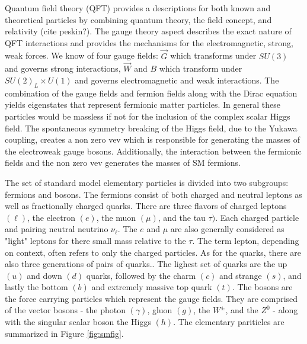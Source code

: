 Quantum field theory (QFT) provides a descriptions for both known and theoretical particles by combining quantum theory, the field concept, and relativity (cite peskin?). The gauge theory aspect describes the exact nature of QFT interactions and provides the mechanisms for the electromagnetic, strong, weak forces.  We know of four gauge fields:  $\vec{G}$ which transforms under $SU(3)$ and governs strong interactions, $\vec{W}$ and $B$ which transform under $SU(2)_L \times U(1)$ and governs electromagnetic and weak interactions. The combination of the gauge fields and fermion fields along with the Dirac equation yields eigenstates that represent fermionic matter particles. In general these particles would be massless if not for the inclusion of the complex scalar Higgs field.  The spontaneous symmetry breaking of the Higgs field, due to the Yukawa coupling, creates a non zero vev which is responsible for generating the masses of the electroweak gauge bosons. Additionally, the interaction between the fermionic fields and the non zero vev generates the masses of SM fermions.

The set of standard model elementary particles is divided into two subgroups: fermions and bosons.  The fermions consist of both charged and neutral leptons as well as fractionally charged quarks. There are three flavors of charged leptons $(\ell)$, the electron $(e)$, the muon $(\mu)$, and the tau $\tau)$. Each charged particle and pairing neutral neutrino $\nu_\ell$. The $e$ and $\mu$ are also generally considered as "light" leptons for there small mass relative to the $\tau$. The term lepton, depending on context, often refers to only the charged particles. As for the quarks, there are also three generations of pairs of quarks.. The lighest set of quarks are the up $(u)$ and down $(d)$ quarks, followed by the charm $(c)$ and strange $(s)$, and lastly the bottom $(b)$ and extremely massive top quark $(t)$.  The bosons are the force carrying particles which represent the gauge fields. They are comprised of the vector bosons - the photon $(\gamma)$, gluon $(g)$, the $W^\pm$, and the $Z^0$ - along with the singular scalar boson the Higgs $(h)$. The elementary pariticles are summarized in Figure \ref{fig:smfig}.






